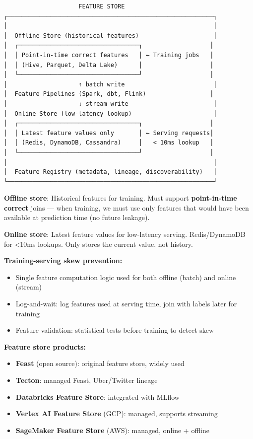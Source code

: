 \documentclass[11pt]{article}
\providecommand{\tightlist}{\setlength{\itemsep}{1pt}\setlength{\parskip}{0pt}}
\begin{document}
\begin{verbatim}
                     FEATURE STORE
┌──────────────────────────────────────────────────────────┐
│                                                          │
│  Offline Store (historical features)                     │
│  ┌──────────────────────────────────┐                   │
│  │ Point-in-time correct features   │ ← Training jobs   │
│  │ (Hive, Parquet, Delta Lake)      │                   │
│  └──────────────────────────────────┘                   │
│                    ↑ batch write                         │
│  Feature Pipelines (Spark, dbt, Flink)                  │
│                    ↓ stream write                        │
│  Online Store (low-latency lookup)                       │
│  ┌──────────────────────────────────┐                   │
│  │ Latest feature values only       │ ← Serving requests│
│  │ (Redis, DynamoDB, Cassandra)     │   < 10ms lookup   │
│  └──────────────────────────────────┘                   │
│                                                          │
│  Feature Registry (metadata, lineage, discoverability)   │
└──────────────────────────────────────────────────────────┘
\end{verbatim}

\textbf{Offline store}: Historical features for training. Must support \textbf{point-in-time correct} joins --- when training, we must use only features that would have been available at prediction time (no future leakage).

\textbf{Online store}: Latest feature values for low-latency serving. Redis/DynamoDB for \textless10ms lookups. Only stores the current value, not history.

\textbf{Training-serving skew prevention:}

\begin{itemize}
\tightlist
\item
  Single feature computation logic used for both offline (batch) and online (stream)
\item
  Log-and-wait: log features used at serving time, join with labels later for training
\item
  Feature validation: statistical tests before training to detect skew
\end{itemize}

\textbf{Feature store products:}

\begin{itemize}
\tightlist
\item
  \textbf{Feast} (open source): original feature store, widely used
\item
  \textbf{Tecton}: managed Feast, Uber/Twitter lineage
\item
  \textbf{Databricks Feature Store}: integrated with MLflow
\item
  \textbf{Vertex AI Feature Store} (GCP): managed, supports streaming
\item
  \textbf{SageMaker Feature Store} (AWS): managed, online + offline
\end{itemize}
\end{document}
